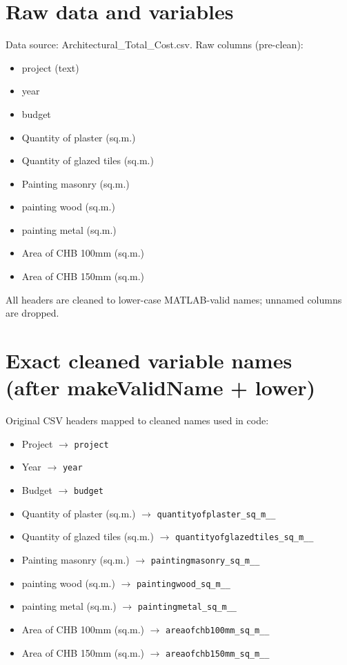 \documentclass[11pt]{article}
\begin{document}
\section*{Raw data and variables}
Data source: Architectural\_Total\_Cost.csv. Raw columns (pre-clean):
\begin{itemize}
  \item project (text)
  \item year
  \item budget
  \item Quantity of plaster (sq.m.)
  \item Quantity of glazed tiles (sq.m.)
  \item Painting masonry (sq.m.)
  \item painting wood (sq.m.)
  \item painting metal (sq.m.)
  \item Area of CHB 100mm (sq.m.)
  \item Area of CHB 150mm (sq.m.)
\end{itemize}
All headers are cleaned to lower-case MATLAB-valid names; unnamed columns are dropped.

\section*{Exact cleaned variable names (after makeValidName + lower)}
Original CSV headers mapped to cleaned names used in code:
\begin{itemize}
  \item Project $\to$ \verb|project|
  \item Year $\to$ \verb|year|
  \item Budget $\to$ \verb|budget|
  \item Quantity of plaster (sq.m.) $\to$ \verb|quantityofplaster_sq_m__|
  \item Quantity of glazed tiles (sq.m.) $\to$ \verb|quantityofglazedtiles_sq_m__|
  \item Painting masonry (sq.m.) $\to$ \verb|paintingmasonry_sq_m__|
  \item painting wood (sq.m.) $\to$ \verb|paintingwood_sq_m__|
  \item painting metal (sq.m.) $\to$ \verb|paintingmetal_sq_m__|
  \item Area of CHB 100mm (sq.m.) $\to$ \verb|areaofchb100mm_sq_m__|
  \item Area of CHB 150mm (sq.m.) $\to$ \verb|areaofchb150mm_sq_m__|
\end{itemize}
\end{document}
